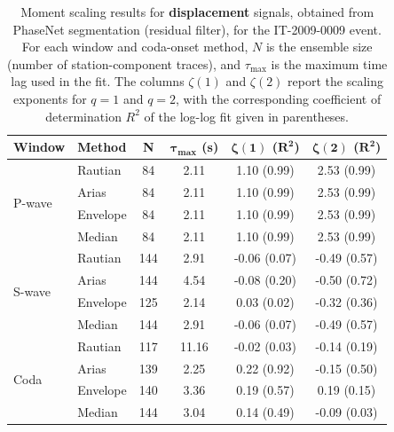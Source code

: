 \begin{table}[H]
\centering
\small
\begin{tabular}{llcccc}
\toprule
\textbf{Window} & \textbf{Method} & \textbf{N} & $\bm{\tau_{\max}}$ \textbf{(s)} & $\bm{\zeta(1)}$ \textbf{(}$\bm{R^2}$\textbf{)} & $\bm{\zeta(2)}$ \textbf{(}$\bm{R^2}$\textbf{)} \\
\midrule
\multirow{4}{*}{P-wave}
& Rautian & 84 & 2.11 & 1.10 (0.99) & 2.53 (0.99) \\
& Arias & 84 & 2.11 & 1.10 (0.99) & 2.53 (0.99) \\
& Envelope & 84 & 2.11 & 1.10 (0.99) & 2.53 (0.99) \\
& Median & 84 & 2.11 & 1.10 (0.99) & 2.53 (0.99) \\
\midrule
\multirow{4}{*}{S-wave}
& Rautian & 144 & 2.91 & -0.06 (0.07) & -0.49 (0.57) \\
& Arias & 144 & 4.54 & -0.08 (0.20) & -0.50 (0.72) \\
& Envelope & 125 & 2.14 & 0.03 (0.02) & -0.32 (0.36) \\
& Median & 144 & 2.91 & -0.06 (0.07) & -0.49 (0.57) \\
\midrule
\multirow{4}{*}{Coda}
& Rautian & 117 & 11.16 & -0.02 (0.03) & -0.14 (0.19) \\
& Arias & 139 & 2.25 & 0.22 (0.92) & -0.15 (0.50) \\
& Envelope & 140 & 3.36 & 0.19 (0.57) & 0.19 (0.15) \\
& Median & 144 & 3.04 & 0.14 (0.49) & -0.09 (0.03) \\
\bottomrule
\end{tabular}
\caption{Moment scaling results for \textbf{displacement} signals, obtained from PhaseNet segmentation (residual filter), for the IT-2009-0009 event. For each window and coda-onset method, $N$ is the ensemble size (number of station-component traces), and $\tau_{\max}$ is the maximum time lag used in the fit. The columns $\zeta(1)$ and $\zeta(2)$ report the scaling exponents for $q=1$ and $q=2$, with the corresponding coefficient of determination $R^2$ of the log-log fit given in parentheses.}
\label{tab:phasenet_scaling_disp_res_filter_laquila}
\end{table}